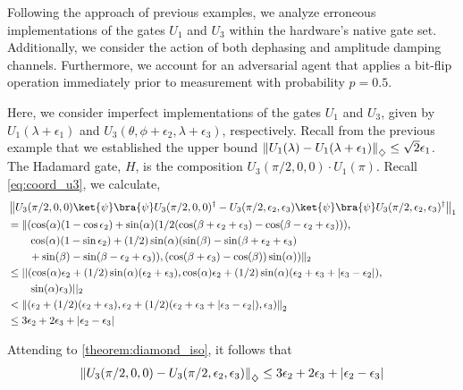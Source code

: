  Following the approach of previous examples, we analyze erroneous implementations of the gates $U_1$ and $U_3$ within the hardware’s native gate set. Additionally, we consider the action of both dephasing and amplitude damping channels. Furthermore, we account for an adversarial agent that applies a bit-flip operation immediately prior to measurement with probability $ p = 0.5 $.  

    Here, we consider imperfect implementations of the gates $U_1$ and $U_3$, given by $ U_1(\lambda + \epsilon_1) $ and $ U_3(\theta, \phi + \epsilon_2, \lambda + \epsilon_3)$, respectively. 
    Recall from the previous example that we established the upper bound $\left\lVert U_1(\lambda)- U_1(\lambda + \epsilon_1)  \right\rVert_{\diamondsuit} \leq \sqrt{2} \epsilon_1$.
     The Hadamard gate, $H$, is the composition $U_3(\pi/2, 0, 0)\cdot U_1(\pi)$. Recall \autoref{eq:coord_u3}, we calculate,
    \begin{align*}
      &\tracenorm{U_3(\pi/2, 0, 0) \ket{\psi}\bra{\psi}U_3(\pi/2, 0, 0)^\dag - U_3(\pi/2, \epsilon_2, \epsilon_3)  \ket{\psi}\bra{\psi}U_3(\pi/2, \epsilon_2, \epsilon_3)^\dag} \\
      & = \lVert (\cos(\alpha)( 1-\cos{\epsilon_2}) + \sin(\alpha)( 1/2(\cos(\beta + \epsilon_2 + \epsilon_3)-\cos(\beta - \epsilon_2 + \epsilon_3))), \\
      & \hspace{20pt} \cos(\alpha)( 1-\sin{\epsilon_2}) + (1/2)\sin(\alpha) (\sin(\beta)-\sin(\beta+\epsilon_2 + \epsilon_3)   \\
      & \hspace{20pt} + \sin(\beta)-\sin(\beta-\epsilon_2 + \epsilon_3)),  (\cos(\beta + \epsilon_3)-\cos(\beta))\sin(\alpha) ) \lVert_2 \\
      & \leq ||(\cos(\alpha) \epsilon_2 + (1/2)\sin(\alpha) (\epsilon_2 + \epsilon_3) ,\cos(\alpha) \epsilon_2 + (1/2)  \sin(\alpha) (\epsilon_2 + \epsilon_3 + |\epsilon_3-\epsilon_2|), \\
      & \hspace{20pt} \sin(\alpha) \epsilon_3)||_2 \\
      &  < \euclideannorm{(\epsilon_2 + (1/2)(\epsilon_2 + \epsilon_3), \epsilon_2 + (1/2)   (\epsilon_2 + \epsilon_3 + |\epsilon_3-\epsilon_2|), \epsilon_3)}  \\
      & \leq 3 \epsilon_2 +  2\epsilon_3 + |\epsilon_2-\epsilon_3| \\
    \end{align*}

    Attending to \autoref{theorem:diamond_iso}, it follows that
    \begin{align*}
      \left\lVert U_3(\pi/2, 0, 0)- U_3(\pi/2, \epsilon_2, \epsilon_3)  \right\rVert_{\diamondsuit} \leq 3 \epsilon_2 +  2\epsilon_3 + |\epsilon_2-\epsilon_3|
    \end{align*}

